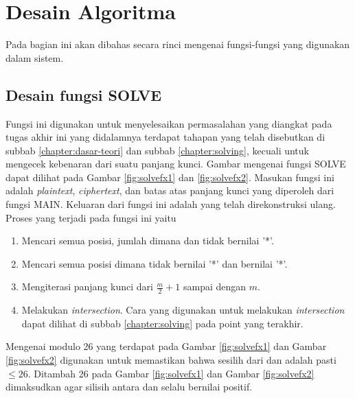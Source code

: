 \section{Desain Algoritma}
 Pada bagian ini akan dibahas secara rinci mengenai fungsi-fungsi yang digunakan dalam sistem.  
  \subsection{Desain fungsi SOLVE}
  \label{chapter:fxsolve}
  Fungsi ini digunakan untuk menyelesaikan permasalahan yang diangkat pada tugas akhir ini yang didalamnya terdapat tahapan yang telah disebutkan di subbab \ref{chapter:dasar-teori} dan subbab \ref{chapter:solving}, kecuali untuk mengecek kebenaran dari suatu panjang kunci. Gambar mengenai fungsi SOLVE dapat dilihat pada Gambar \ref{fig:solvefx1} dan \ref{fig:solvefx2}. Masukan fungsi ini adalah \textit{plaintext}, \textit{ciphertext}, dan batas atas panjang kunci yang diperoleh dari fungsi MAIN. Keluaran dari fungsi ini adalah \plaintext yang telah direkonstruksi ulang. Proses yang terjadi pada fungsi ini yaitu
  \begin{enumerate}
  \item Mencari semua posisi, jumlah dimana \plaintext dan \ciphertext tidak bernilai '*'.
  \item Mencari semua posisi dimana \ciphertext tidak bernilai '*' dan \plaintext bernilai '*'.
  \item Mengiterasi panjang kunci dari $\frac{m}{2}+1$ sampai dengan $m$.
  \item Melakukan \textit{intersection}. Cara yang digunakan untuk melakukan \textit{intersection} dapat dilihat di subbab \ref{chapter:solving} pada point yang terakhir.
  \end{enumerate}

	Mengenai modulo 26 yang terdapat pada Gambar \ref{fig:solvefx1} dan Gambar \ref{fig:solvefx2} digunakan untuk memastikan bahwa sesilih dari \plaintext dan \ciphertext adalah pasti $\leq 26$. Ditambah 26 pada Gambar \ref{fig:solvefx1} dan Gambar \ref{fig:solvefx2} dimaksudkan agar silisih antara \plaintext dan \ciphertext selalu bernilai positif.  
  
